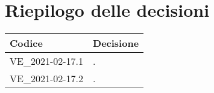 \section{Riepilogo delle decisioni}
\setcounter{table}{-1}
{
\centering
\renewcommand{\arraystretch}{1.5}
\begin{longtable}{>{\centering}p{} >{}p{}}
\rowcolor{azzurro1}
\textbf{Codice} &
\centerline{\textbf{Decisione}}\\
\endhead

VE{\_}2021-02-17.1 & . \\
VE{\_}2021-02-17.2 & .\\
\end{longtable}
}